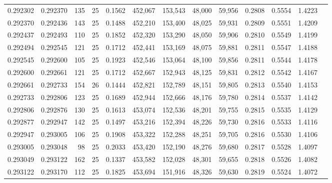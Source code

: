 \begin{tabular}{rrrrrrrrrrrrr}
0.292302 & 0.292370 &   135 &  25 &                                     0.1562 & 452,067 & 153,543 &  48,000 &  59,956 & 0.2808 & 0.5554 & 1.4223 \\
0.292370 & 0.292436 &   143 &  25 &                                     0.1488 & 452,210 & 153,400 &  48,025 &  59,931 & 0.2809 & 0.5551 & 1.4209 \\
0.292437 & 0.292493 &   110 &  25 &                                     0.1852 & 452,320 & 153,290 &  48,050 &  59,906 & 0.2810 & 0.5549 & 1.4199 \\
0.292494 & 0.292545 &   121 &  25 &                                     0.1712 & 452,441 & 153,169 &  48,075 &  59,881 & 0.2811 & 0.5547 & 1.4188 \\
0.292545 & 0.292600 &   105 &  25 &                                     0.1923 & 452,546 & 153,064 &  48,100 &  59,856 & 0.2811 & 0.5544 & 1.4178 \\
0.292600 & 0.292661 &   121 &  25 &                                     0.1712 & 452,667 & 152,943 &  48,125 &  59,831 & 0.2812 & 0.5542 & 1.4167 \\
0.292661 & 0.292733 &   154 &  26 &                                     0.1444 & 452,821 & 152,789 &  48,151 &  59,805 & 0.2813 & 0.5540 & 1.4153 \\
0.292733 & 0.292806 &   123 &  25 &                                     0.1689 & 452,944 & 152,666 &  48,176 &  59,780 & 0.2814 & 0.5537 & 1.4142 \\
0.292806 & 0.292876 &   130 &  25 &                                     0.1613 & 453,074 & 152,536 &  48,201 &  59,755 & 0.2815 & 0.5535 & 1.4129 \\
0.292877 & 0.292947 &   142 &  25 &                                     0.1497 & 453,216 & 152,394 &  48,226 &  59,730 & 0.2816 & 0.5533 & 1.4116 \\
0.292947 & 0.293005 &   106 &  25 &                                     0.1908 & 453,322 & 152,288 &  48,251 &  59,705 & 0.2816 & 0.5530 & 1.4106 \\
0.293005 & 0.293048 &    98 &  25 &                                     0.2033 & 453,420 & 152,190 &  48,276 &  59,680 & 0.2817 & 0.5528 & 1.4097 \\
0.293049 & 0.293122 &   162 &  25 &                                     0.1337 & 453,582 & 152,028 &  48,301 &  59,655 & 0.2818 & 0.5526 & 1.4082 \\
0.293122 & 0.293170 &   112 &  25 &                                     0.1825 & 453,694 & 151,916 &  48,326 &  59,630 & 0.2819 & 0.5524 & 1.4072 \\

\end{tabular}
